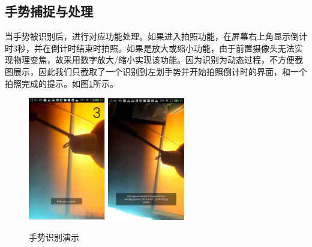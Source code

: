 \documentclass{XDBAthesis}
\begin{document}
\subsection{手势捕捉与处理}
当手势被识别后，进行对应功能处理。如果进入拍照功能，在屏幕右上角显示倒计时3秒，并在倒计时结束时拍照。如果是放大或缩小功能，由于前置摄像头无法实现物理变焦，故采用数字放大/缩小实现该功能。因为识别为动态过程，不方便截图展示，因此我们只截取了一个识别到左划手势并开始拍照倒计时的界面，和一个拍照完成的提示。如图\ref{fg:3}所示。
\begin{figure}[htb]
    \centering
    \includegraphics[width=0.3\textwidth ]{figure/recognize}%
    \includegraphics[width=0.3\textwidth ]{figure/capture}
    \caption{手势识别演示}
    \label{fg:3}
\end{figure}


\ifx\allfiles\undefined
%

\end{document}
